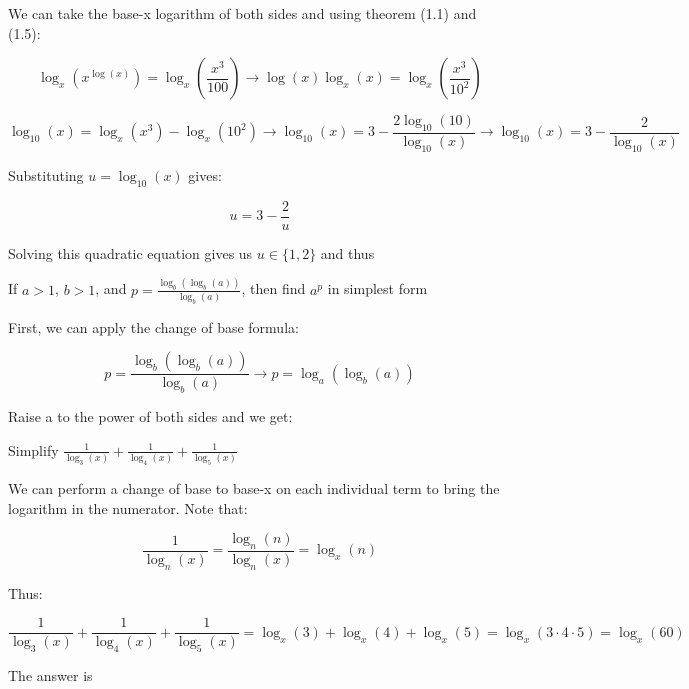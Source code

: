 \begin{solution}
We can take the base-x logarithm of both sides and using theorem (1.1) and (1.5):

$$
  \log_x(x^{\log(x)}) = \log_x(\frac{x^3}{100}) 
  \rightarrow 
  \log(x)\log_x(x) = \log_x(\frac{x^3}{10^2})
$$

$$
  \log_{10}(x) = \log_x(x^3)-\log_x(10^2)
  \rightarrow
  \log_{10}(x) = 3-\frac{2\log_{10}(10)}{\log_{10}(x)}
  \rightarrow
  \log_{10}(x) = 3-\frac{2}{\log_{10}(x)}
$$

Substituting $u=\log_{10}(x)$ gives:

$$ u = 3-\frac{2}{u} $$

Solving this quadratic equation gives us $u\in\{1,2\}$ and thus 

\end{solution}

\begin{question}

If $a > 1$, $b > 1$, and $p = \frac{\log_b(\log_b(a))}{\log_b(a)}$, then find $a^p$ in simplest form

\end{question}

\begin{solution}

First, we can apply the change of base formula:

$$ 
   p = \frac{\log_b(\log_b(a))}{\log_b(a)} \rightarrow
   p = \log_a(\log_b(a))
$$

Raise a to the power of both sides and we get: 

\end{solution}

\begin{question}

Simplify $\frac{1}{\log_3(x)} + \frac{1}{\log_4(x)} + \frac{1}{\log_5(x)}$

\end{question}

\begin{solution}
We can perform a change of base to base-x on each individual term to bring the logarithm in the numerator. Note that:

$$\frac{1}{\log_n(x)} = \frac{\log_n(n)}{\log_n(x)} = \log_x(n)$$

Thus:

$$
\frac{1}{\log_3(x)} + \frac{1}{\log_4(x)} + \frac{1}{\log_5(x)} =
\log_x(3) + \log_x(4) + \log_x(5) =
\log_x(3 \cdot 4 \cdot 5) =
\log_x(60)
$$

The answer is 

\newpage
\end{solution}

